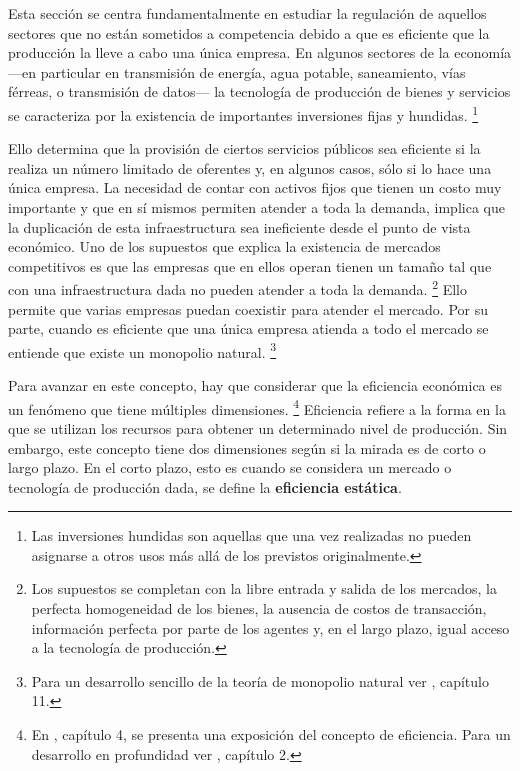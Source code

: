 \documentclass[
  12pt,
  spanish,
]{book}
\begin{document}
Esta sección se centra fundamentalmente en estudiar la regulación de
aquellos sectores que no están sometidos a competencia debido a que es
eficiente que la producción la lleve a cabo una única empresa. En
algunos sectores de la economía ---en particular en transmisión de
energía, agua potable, saneamiento, vías férreas, o transmisión de
datos--- la tecnología de producción de bienes y servicios se
caracteriza por la existencia de importantes inversiones fijas y
hundidas. \footnote{Las inversiones hundidas son aquellas que una vez
  realizadas no pueden asignarse a otros usos más allá de los previstos
  originalmente.}

Ello determina que la provisión de ciertos servicios públicos sea
eficiente si la realiza un número limitado de oferentes y, en algunos
casos, sólo si lo hace una única empresa. La necesidad de contar con
activos fijos que tienen un costo muy importante y que en sí mismos
permiten atender a toda la demanda, implica que la duplicación de esta
infraestructura sea ineficiente desde el punto de vista económico. Uno
de los supuestos que explica la existencia de mercados competitivos es
que las empresas que en ellos operan tienen un tamaño tal que con una
infraestructura dada no pueden atender a toda la demanda. \footnote{Los
  supuestos se completan con la libre entrada y salida de los mercados,
  la perfecta homogeneidad de los bienes, la ausencia de costos de
  transacción, información perfecta por parte de los agentes y, en el
  largo plazo, igual acceso a la tecnología de producción.} Ello permite
que varias empresas puedan coexistir para atender el mercado. Por su
parte, cuando es eficiente que una única empresa atienda a todo el
mercado se entiende que existe un monopolio natural. \footnote{Para un
  desarrollo sencillo de la teoría de monopolio natural ver
  \citet{Viscusi2005}, capítulo 11.}

Para avanzar en este concepto, hay que considerar que la eficiencia
económica es un fenómeno que tiene múltiples dimensiones. \footnote{En
  \citet{Viscusi2005}, capítulo 4, se presenta una exposición del
  concepto de eficiencia. Para un desarrollo en profundidad ver
  \citet{Motta2004}, capítulo 2.} Eficiencia refiere a la forma en la
que se utilizan los recursos para obtener un determinado nivel de
producción. Sin embargo, este concepto tiene dos dimensiones según si la
mirada es de corto o largo plazo. En el corto plazo, esto es cuando se
considera un mercado o tecnología de producción dada, se define la
\textbf{eficiencia estática}.
\end{document}
